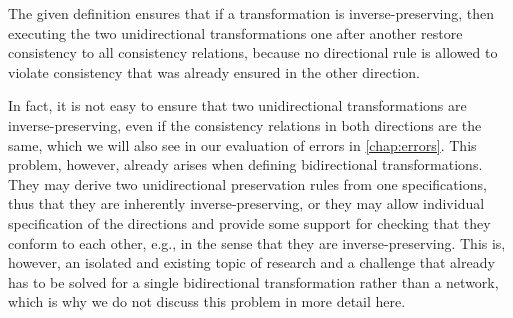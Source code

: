 The given definition ensures that if a transformation is inverse-preserving, then executing the two unidirectional transformations one after another restore consistency to all consistency relations, because no directional rule is allowed to violate consistency that was already ensured in the other direction.

\begin{proposition}
\end{proposition}

In fact, it is not easy to ensure that two unidirectional transformations are inverse-preserving, even if the consistency relations in both directions are the same, which we will also see in our evaluation of errors in \autoref{chap:errors}.
This problem, however, already arises when defining bidirectional transformations.
They may derive two unidirectional preservation rules from one specifications, thus that they are inherently inverse-preserving, or they may allow individual specification of the directions and provide some support for checking that they conform to each other, e.g., in the sense that they are inverse-preserving.
This is, however, an isolated and existing topic of research and a challenge that already has to be solved for a single bidirectional transformation rather than a network, which is why we do not discuss this problem in more detail here.

